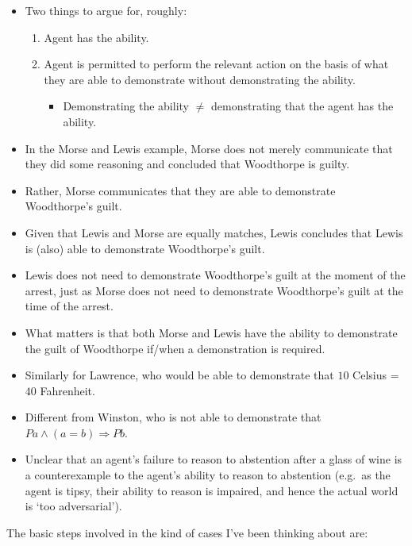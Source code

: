 \documentclass[10pt]{article}
\begin{document}
\begin{itemize}
\item Two things to argue for, roughly:
  \begin{enumerate}
  \item Agent has the ability.
  \item Agent is permitted to perform the relevant action on the basis of what they are able to demonstrate without demonstrating the ability.
    \begin{itemize}
    \item Demonstrating the ability \(\ne\) demonstrating that the agent has the ability.
    \end{itemize}
  \end{enumerate}
\end{itemize}

\begin{itemize}
\item In the Morse and Lewis example, Morse does not merely communicate that they did some reasoning and concluded that Woodthorpe is guilty.
\item Rather, Morse communicates that they are able to demonstrate Woodthorpe's guilt.
\item Given that Lewis and Morse are equally matches, Lewis concludes that Lewis is (also) able to demonstrate Woodthorpe's guilt.
\item Lewis does not need to demonstrate Woodthorpe's guilt at the moment of the arrest, just as Morse does not need to demonstrate Woodthorpe's guilt at the time of the arrest.
\item What matters is that both Morse and Lewis have the ability to demonstrate the guilt of Woodthorpe if/when a demonstration is required.
\item Similarly for Lawrence, who would be able to demonstrate that \(10\) Celsius = \(40\) Fahrenheit.
\item Different from Winston, who is not able to demonstrate that \(Pa \land (a = b) \Rightarrow  Pb\).
\item Unclear that an agent's failure to reason to abstention after a glass of wine is a counterexample to the agent's ability to reason to abstention (e.g.\ as the agent is tipsy, their ability to reason is impaired, and hence the actual world is `too adversarial').
\end{itemize}

\newpage


The basic steps involved in the kind of cases I've been thinking about are:
\end{document}
